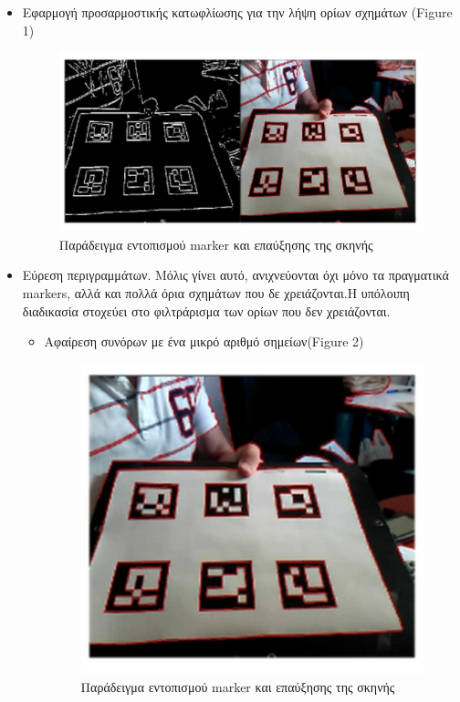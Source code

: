 \begin{itemize}
\item Εφαρμογή προσαρμοστικής κατωφλίωσης για την λήψη ορίων σχημάτων (Figure 1)

\begin{figure}[H]
    \centering
    \includegraphics[scale=0.6, angle=0]{Files/Figures/aruco1.png}
    \caption[Παράδειγμα εντοπισμού marker και επαύξησης της σκηνής \cite{howmarkerswork}]{ Παράδειγμα εντοπισμού marker και επαύξησης της σκηνής }
    \label{fig:aruco1}
\end{figure}


\item Εύρεση περιγραμμάτων. Μόλις γίνει αυτό, ανιχνεύονται όχι μόνο τα πραγματικά markers, αλλά και πολλά όρια σχημάτων που δε χρειάζονται.Η υπόλοιπη διαδικασία στοχεύει στο φιλτράρισμα των ορίων που δεν χρειάζονται.
\begin{itemize}
\item Αφαίρεση συνόρων με ένα μικρό αριθμό σημείων(Figure 2)


\begin{figure}[H]
    \centering
    \includegraphics[scale=0.6, angle=0]{Files/Figures/aruco2.png}
    \caption[Παράδειγμα εντοπισμού marker και επαύξησης της σκηνής \cite{howmarkerswork}]{ Παράδειγμα εντοπισμού marker και επαύξησης της σκηνής \cite{howmarkerswork}}
    \label{fig:aruco2}
\end{figure}




\end{itemize}
\end{itemize}
